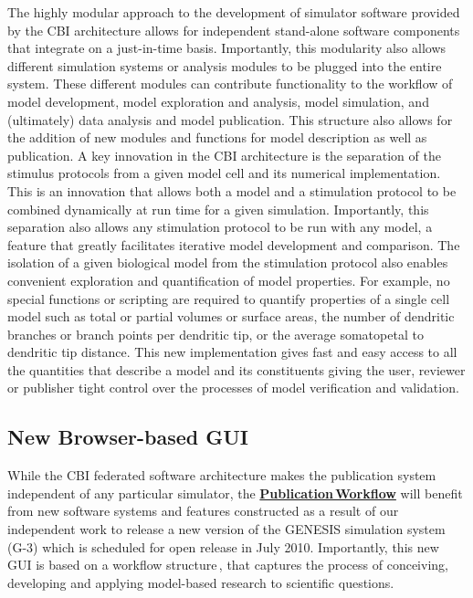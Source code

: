 \documentclass[12pt]{article}
\begin{document}
The highly modular approach to the development of simulator software provided by the CBI architecture allows for independent stand-alone software components that integrate on a just-in-time basis.  Importantly, this modularity also allows different simulation systems or analysis modules to be plugged into the entire system.  These different modules can contribute functionality to the workflow of model development, model exploration and analysis, model simulation, and (ultimately) data analysis and model publication.  This structure also allows for the addition of new modules and functions for model description as well as publication. A key innovation in the CBI architecture is the separation of the stimulus protocols from a given model cell and its numerical implementation. This is an innovation that allows both a model and a stimulation protocol to be combined dynamically at run time for a given simulation. Importantly, this separation also allows any stimulation protocol to be run with any model, a feature that greatly facilitates iterative model development and comparison. The isolation of a given biological model from the stimulation protocol also enables convenient exploration and quantification of model properties. For example, no special functions or scripting are required to quantify properties of a single cell model such as total or partial volumes or surface areas, the number of dendritic branches or branch points per dendritic tip, or the average somatopetal to dendritic tip distance. This new implementation gives fast and easy access to all the quantities that describe a model and its constituents giving the user, reviewer or publisher tight control over the processes of model verification and validation.

\subsection*{New Browser-based GUI}

While the CBI federated software architecture makes the publication system independent of any particular simulator, the  \href{../publication/publication.tex}{\bf Publication\,Workflow} will benefit from new software systems and features constructed as a result of our independent work to release a new version of the GENESIS simulation system (G-3) which is scheduled for open release in July 2010. Importantly, this new GUI is based on a workflow structure\,\cite{Tiwari:2007lh}, that captures the process of conceiving, developing and applying model-based research to scientific questions.
\end{document}
